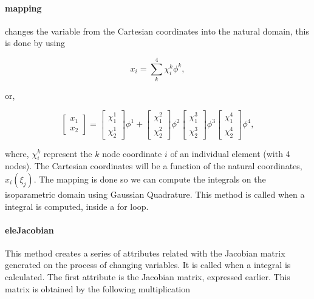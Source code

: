 \documentclass[10pt, a4paper]{article}
\begin{document}
\paragraph{\textsf{mapping}} changes the variable from the Cartesian coordinates into the natural domain, this is done by using

\begin{equation*}
x_i = \sum_k^4 \chi^k_i \phi^k,
\end{equation*}

or,

\begin{equation*}
\begin{bmatrix}
x_1 \\[.2cm]
x_2
\end{bmatrix} = \begin{bmatrix}
\chi^1_1 \\[.2cm]
\chi^1_2
\end{bmatrix} \phi^1 +
\begin{bmatrix}
\chi^2_1 \\[.2cm]
\chi^2_2
\end{bmatrix} \phi^2
\begin{bmatrix}
\chi^3_1 \\[.2cm]
\chi^3_2
\end{bmatrix} \phi^3
\begin{bmatrix}
\chi^4_1 \\[.2cm]
\chi^4_2
\end{bmatrix} \phi^4,
\end{equation*}

where, $\chi^k_i$ represent the $k$ node coordinate $i$ of an individual element (with 4 nodes). The Cartesian coordinates will be a function of the natural coordinates, $x_i(\xi_j)$. The mapping is done so we can compute the integrals on the isoparametric domain using Gaussian Quadrature. This method is called when a integral is computed, inside a \textsf{for} loop.

\paragraph{eleJacobian}

This method creates a series of attributes related with the Jacobian matrix generated on the process of changing variables. It is called when a integral is calculated. The first attribute is the Jacobian matrix, expressed earlier. This matrix is obtained by the following multiplication
\end{document}
